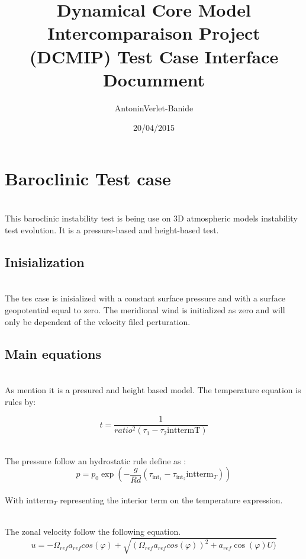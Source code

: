 \documentclass{article}
\title{Dynamical Core Model Intercomparaison Project (DCMIP) Test Case Interface Documment}                  %
\author{AntoninVerlet-Banide}                          %
\date{20/04/2015}                              %
\begin{document}
\maketitle{}                                   %

\section{Baroclinic Test case}   
 
~\\ This baroclinic instability test is being use on 3D atmospheric models instability test evolution. It is a pressure-based and height-based test. 

 \subsection{ Inisialization }
 ~\\ The tes case is inisialized with a constant surface pressure and with a surface geopotential equal to zero. The meridional wind is initialized as zero and will only be dependent of the velocity filed perturation. 

\subsection{Main equations}

~\\ As mention it is a presured and height based model.  The temperature equation is rules by:

\begin{equation*}
t=\frac{1}{ratio^2(\tau_1-\tau_2 \text{inttermT})} 
\end{equation*}

~\\ The pressure follow an hydrostatic rule define as :
\begin{equation}
p=p_0\exp(-\frac{g}{Rd}(\tau_{\text{int}_1}-\tau_{\text{int}_2}\text{intterm}_T))
\end{equation}
~\\ With $\text{intterm}_T$ representing the interior term on the temperature expression. 
\clearpage


~\\ The zonal velocity follow the following equation.  
\begin{equation}
 u=-\Omega_{ref} a_{ref} cos(\varphi)+\sqrt{(\Omega_{ref} a_{ref} cos(\varphi))^2+ a_{ref} \cos(\varphi)U)}
\end{equation}
\end{document}
